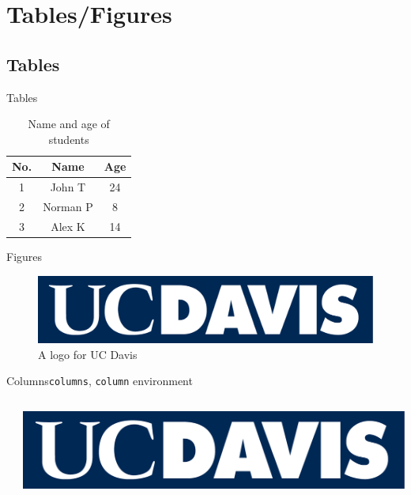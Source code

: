 \documentclass{beamer}
\begin{document}
\section{Tables/Figures}

\subsection{Tables}

\begin{frame}{Tables}

\begin{table}
\begin{tabular}{| c || c | c |}
    \hline
    No. & Name & Age \\
    \hline \hline
    1 & John T & 24 \\
    2 & Norman P & 8 \\
    3 & Alex K & 14 \\ 
    \hline
\end{tabular}
\caption{Name and age of students}
\end{table}

\end{frame}

\begin{frame}{Figures}
\begin{figure}
    \includegraphics[width=0.8\linewidth]{DavisLogoV3.png}
    \caption{A logo for UC Davis}
\end{figure}
\end{frame}

\begin{frame}{Columns}{\texttt{columns}, \texttt{column} environment}
\begin{columns}
    \begin{column}{0.5\textwidth} %
        \tiny{\lipsum[1-1]}
    \end{column}

    \begin{column}{0.5\textwidth} %
        \includegraphics[width=0.9\columnwidth]{DavisLogoV3.png}
    \end{column}
\end{columns}
\end{frame}
\end{document}
